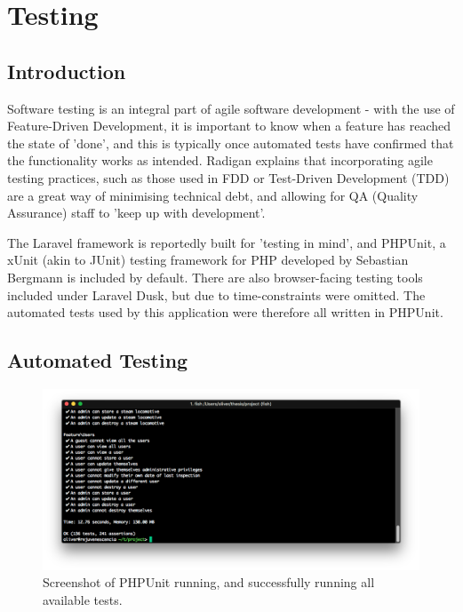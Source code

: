 \chapter{Testing}

\section{Introduction}

Software testing is an integral part of agile software development - with the use of Feature-Driven Development, it is important to know when a feature has reached the state of 'done', and this is typically once automated tests have confirmed that the functionality works as intended. \cite{Karam1} Radigan explains that incorporating agile testing practices, such as those used in FDD or Test-Driven Development (TDD) are a great way of minimising technical debt, and allowing for QA (Quality Assurance) staff to 'keep up with development'. \cite{Radigan1}

The Laravel framework is reportedly built for 'testing in mind', and PHPUnit, a xUnit (akin to JUnit) testing framework for PHP developed by Sebastian Bergmann is included by default. There are also browser-facing testing tools included under Laravel Dusk, but due to time-constraints were omitted. The automated tests used by this application were therefore all written in PHPUnit. \cite{Laravel10} \cite{Bergmann1}


\section{Automated Testing}

\begin{figure}[!ht]
    \centering
    \includegraphics[width=1.0\textwidth]{Figures/tests}
    \caption{Screenshot of PHPUnit running, and successfully running all available tests.}
    \label{fig:testscmd}
\end{figure}

